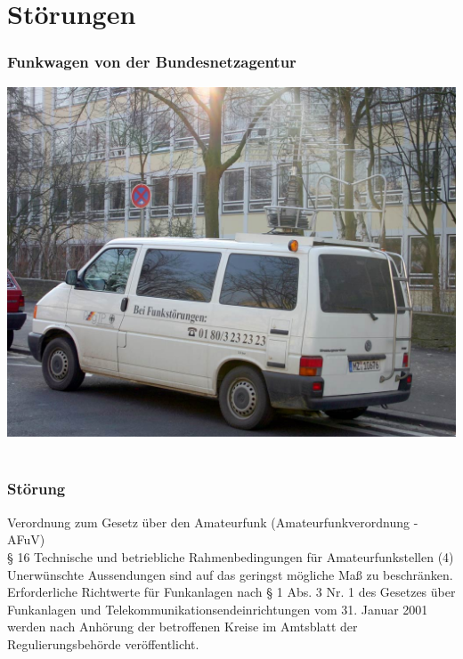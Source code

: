 

\subtitle{Technik A08: \\
            EMV und Sicherheit \\[2em]}
\date{Stand 25.5.2015}


\section*{Störungen}

\begin{frame}
    \frametitle{Funkwagen von der Bundesnetzagentur}
    \begin{center}
		\includegraphics[width=1\textwidth]{a19/FunkwagenBNetz.jpg}\\
        \tiny \hyperlink{refs}{\cite{wm}} \\[1em]
	\end{center}
\end{frame}

\begin{frame}
    \frametitle{Störung}
    \begin{center}
	\begin{block}{Verordnung zum Gesetz über den Amateurfunk (Amateurfunkverordnung - AFuV) \\
§ 16 Technische und betriebliche Rahmenbedingungen für Amateurfunkstellen}
	   (4) Unerwünschte Aussendungen sind auf das geringst mögliche Maß zu beschränken. Erforderliche Richtwerte für Funkanlagen nach § 1 Abs. 3 Nr. 1 des Gesetzes über Funkanlagen und Telekommunikationsendeinrichtungen vom 31. Januar 2001 werden nach Anhörung der betroffenen Kreise im Amtsblatt der Regulierungsbehörde veröffentlicht.
	\end{block}
    \end{center}
\end{frame}


